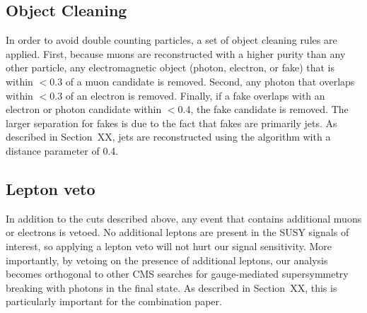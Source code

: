 \subsection{Object Cleaning}
\label{sec:ObjCleaning}

In order to avoid double counting particles, a set of object cleaning rules are applied. 
First, because muons are reconstructed with a higher purity than any other particle, 
any electromagnetic object (photon, electron, or fake) that is within \dR $< 0.3$ of a muon candidate is removed.
Second, any photon that overlaps within \dR $< 0.3$ of an electron is removed. Finally, if a fake overlaps with an electron or 
photon candidate within \dR $< 0.4$, the fake candidate is removed. The larger \dR separation for fakes is due to the fact
that fakes are primarily jets. As described in Section~XX, jets are reconstructed using the \antikt algorithm with a distance
parameter of 0.4.  

\subsection{Lepton veto}
\label{sec:lepVeto}

In addition to the cuts described above, any event that contains additional muons or electrons is vetoed. 
No additional leptons are present in the SUSY signals of interest, so applying a lepton veto will not hurt our signal sensitivity.
More importantly, by vetoing on the presence of additional leptons, our analysis becomes orthogonal to other CMS searches for
gauge-mediated supersymmetry breaking with photons in the final state. As described in Section~XX, this is particularly
important for the combination paper.


